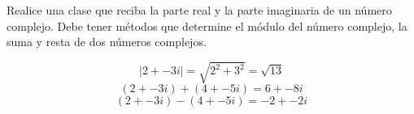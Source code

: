 \begin{exercise}{\rm 

Realice una clase que reciba la parte real y la parte imaginaria de un
número complejo. Debe tener métodos que determine el módulo del número
complejo, la suma y resta de dos números complejos.

\[ |2 +- 3i| = \sqrt{2^2 + 3^2} = \sqrt{13} \]
\[ (2+-3i) + (4+-5i) = 6 +- 8i \] \[ (2+-3i) - (4+-5i) = -2 +- 2i \]

\begin{Shaded}
\begin{Highlighting}[]

     \NormalTok{(}
        \OperatorTok{=}
        \OperatorTok{=}

    \NormalTok{):}
        \OperatorTok{**} \OperatorTok{+} \OperatorTok{**}\NormalTok{)}

     \NormalTok{(}\NormalTok{):}
         \SpecialCharTok{\{}\SpecialCharTok{\}}\SpecialCharTok{\{}\SpecialCharTok{\}}

     \NormalTok{(}
        \OperatorTok{+}\OperatorTok{+}

     \NormalTok{(}
        \OperatorTok{{-}}\OperatorTok{{-}}

\OperatorTok{=}\NormalTok{,}\NormalTok{)}


\end{Highlighting}
\end{Shaded}}
\end{exercise}
